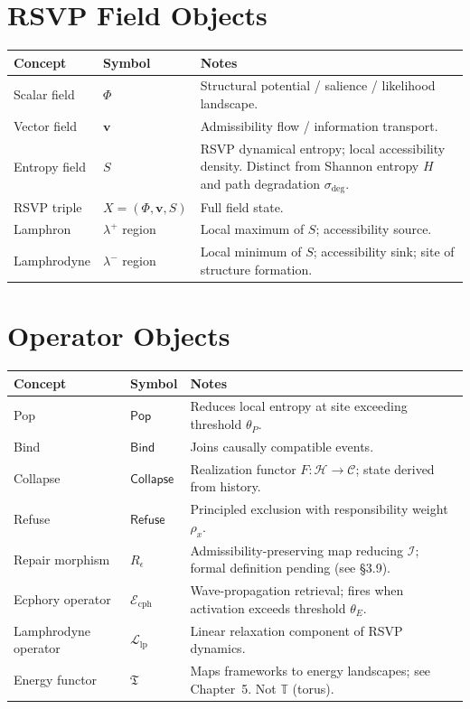 \documentclass[11pt, a4paper]{book}
\theoremstyle{flyxion}
\theoremstyle{remark}
\begin{document}
\section{RSVP Field Objects}

\medskip
\begin{longtable}{p{3.5cm}p{3cm}p{6.5cm}}
\toprule
\textbf{Concept} & \textbf{Symbol} & \textbf{Notes} \\
\midrule
Scalar field & $\Phi$ & Structural potential / salience / likelihood
  landscape. \\
Vector field & $\mathbf{v}$ & Admissibility flow / information
  transport. \\
Entropy field & $S$ & RSVP dynamical entropy; local accessibility
  density. Distinct from Shannon entropy $H$ and path
  degradation $\sigma_\mathrm{deg}$. \\
RSVP triple & $X = (\Phi, \mathbf{v}, S)$ & Full field state. \\
Lamphron & $\lambda^+$ region & Local maximum of $S$; accessibility
  source. \\
Lamphrodyne & $\lambda^-$ region & Local minimum of $S$; accessibility
  sink; site of structure formation. \\
\bottomrule
\end{longtable}

\section{Operator Objects}

\medskip
\begin{longtable}{p{3.5cm}p{3cm}p{6.5cm}}
\toprule
\textbf{Concept} & \textbf{Symbol} & \textbf{Notes} \\
\midrule
Pop & $\mathsf{Pop}$ & Reduces local entropy at site exceeding
  threshold $\theta_P$. \\
Bind & $\mathsf{Bind}$ & Joins causally compatible events. \\
Collapse & $\mathsf{Collapse}$ & Realization functor $F: \mathcal{H}
  \to \mathcal{C}$; state derived from history. \\
Refuse & $\mathsf{Refuse}$ & Principled exclusion with responsibility
  weight $\rho_x$. \\
Repair morphism & $R_\epsilon$ & Admissibility-preserving map
  reducing $\mathcal{I}$; formal definition pending (see §3.9). \\
Ecphory operator & $\mathcal{E}_\mathrm{cph}$ & Wave-propagation
  retrieval; fires when activation exceeds threshold $\theta_E$. \\
Lamphrodyne operator & $\mathcal{L}_\mathrm{lp}$ & Linear relaxation
  component of RSVP dynamics. \\
Energy functor & $\mathfrak{T}$ & Maps frameworks to energy landscapes;
  see Chapter~5. Not $\mathbb{T}$ (torus). \\
\bottomrule
\end{longtable}
\end{document}
